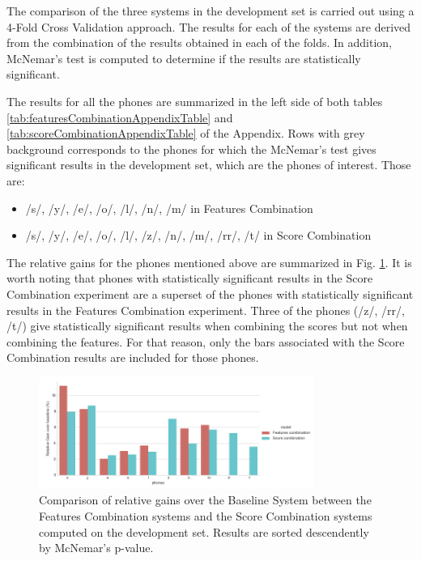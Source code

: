 The comparison of the three systems
in the development set is carried out using a 4-Fold Cross Validation
approach. The results for each of
the systems are derived from the combination of the
results obtained in each of the folds.
In addition, McNemar's test is computed to determine if the
results are statistically significant.

The results for all the phones are summarized in the left side of both tables
\ref{tab:featuresCombinationAppendixTable} and \ref{tab:scoreCombinationAppendixTable}
of the Appendix. Rows with grey background corresponds to the phones for which
the McNemar's test gives significant results in the development set, which are the
phones of interest. Those are:

\begin{itemize}
	\item /s/, /y/, /e/, /o/, /l/, /n/, /m/ in Features Combination
	\item /s/, /y/, /e/, /o/, /l/, /z/, /n/, /m/, /rr/, /t/ in Score Combination
\end{itemize}

The relative gains for the phones mentioned above are summarized in
Fig. \ref{fig:fusionMcnemarDev}.
It is worth noting that phones with statistically significant results in
the Score Combination experiment are a superset of the phones with statistically
significant results in the Features Combination experiment.
Three of the phones (/z/, /rr/, /t/) give statistically significant results
when combining the scores but not when combining the features.
For that reason, only the bars associated with the Score Combination results are
included for those phones.

\begin{figure}[H]
	\centering
	\includegraphics[width=0.8\textwidth]{files/figures/results/relatives/relatives-fusion-systems-dev-mcnemar.png}
	\caption{Comparison of relative gains over the Baseline System
	between the Features Combination systems
	and the Score Combination systems
	computed on the development set. Results are sorted descendently by McNemar's p-value.}
	\label{fig:fusionMcnemarDev}
\end{figure}

